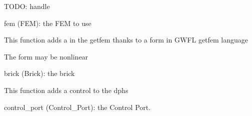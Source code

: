 \documentclass[letterpaper,10pt,english]{sphinxmanual}
\begin{document}
\begin{fulllineitems}
\begin{fulllineitems}
\sphinxAtStartPar
TODO: handle 
\begin{description}
\sphinxAtStartPar
fem (FEM): the FEM to use

\end{description}

\end{fulllineitems}


\begin{fulllineitems}
\label{\detokenize{scrimp:scrimp.dphs.DPHS.add_brick}}
\pysigstartsignatures
\pysiglinewithargsret
{}
{}
{}
\pysigstopsignatures
\sphinxAtStartPar
This function adds a  in the getfem  thanks to a form in GWFL getfem language

\sphinxAtStartPar
The form may be non\sphinxhyphen{}linear
\begin{description}
\sphinxAtStartPar
brick (Brick): the brick

\end{description}

\end{fulllineitems}


\begin{fulllineitems}
\label{\detokenize{scrimp:scrimp.dphs.DPHS.add_control_port}}
\pysigstartsignatures
\pysiglinewithargsret
{}
{}
{}
\pysigstopsignatures
\sphinxAtStartPar
This function adds a control  to the dphs
\begin{description}
\sphinxAtStartPar
control\_port (Control\_Port): the Control Port.

\end{description}

\end{fulllineitems}


\end{fulllineitems}
\end{document}
